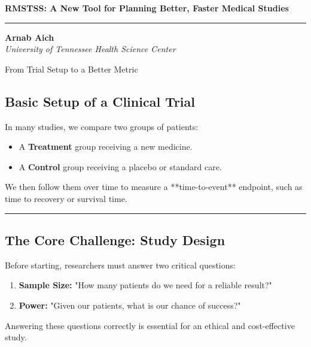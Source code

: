 \documentclass[a0,landscape]{a0poster}
\begin{document}
\begin{center}
    \veryHuge \textbf{RMSTSS: A New Tool for Planning Better, Faster Medical Studies} \\
    \vspace{0.25cm}
    \rule{\linewidth}{1.5pt}
    \vspace{0.25cm}
    \Huge \textbf{Arnab Aich} \\
     \textit{University of Tennessee Health Science Center}
\end{center}

\vspace{0.5cm}

\begin{multicols}{3}

\begin{posterbox}{From Trial Setup to a Better Metric}

    \subsection*{ Basic Setup of a Clinical Trial}
    
    In many studies, we compare two groups of patients:
    \begin{itemize} \itemsep=0.5em
        \item A \textbf{Treatment} group receiving a new medicine.
        \item A \textbf{Control} group receiving a placebo or standard care.
    \end{itemize}
    We then follow them over time to measure a **time-to-event** endpoint, such as time to recovery or survival time.

    \vspace{0.5cm}\hrule\vspace{0.5cm}

    \subsection*{ The Core Challenge: Study Design}
    
    Before starting, researchers must answer two critical questions:
    \begin{enumerate} \itemsep=0.5em
        \item \textbf{Sample Size:} "How many patients do we need for a reliable result?"
        \item \textbf{Power:} "Given our patients, what is our chance of success?"
    \end{enumerate}
    Answering these questions correctly is essential for an ethical and cost-effective study.


\end{posterbox}
\end{multicols}
\end{document}

